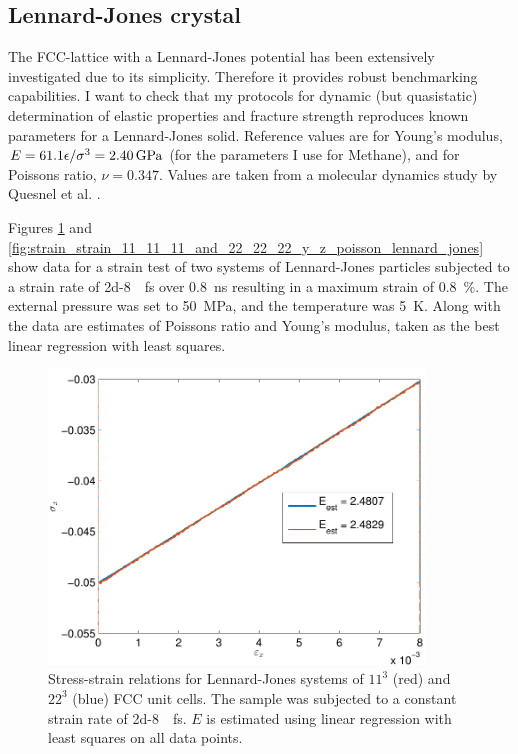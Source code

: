 \subsection{Lennard-Jones crystal}
The FCC-lattice with a Lennard-Jones potential has been extensively investigated due to its simplicity. Therefore it provides robust benchmarking capabilities. I want to check that my protocols for dynamic (but quasistatic) determination of elastic properties and fracture strength reproduces known parameters for a Lennard-Jones solid. Reference values are for Young's modulus, $E=61.1 \epsilon/\sigma^3 = \text{\SI{2.40}{\giga\pascal}}$ (for the parameters I use for Methane), and for Poissons ratio, $\nu=0.347$. Values are taken from a molecular dynamics study by Quesnel et al. \cite{Quesnel1993}.

Figures \ref{fig:stress_strain_11_11_11_and_22_22_22_y_z_poisson_lennard_jones} and \ref{fig:strain_strain_11_11_11_and_22_22_22_y_z_poisson_lennard_jones} show data for a strain test of two systems of Lennard-Jones particles subjected to a strain rate of \SI{2d-8}{\per\femto\second} over \SI{0.8}{\nano\second} resulting in a maximum strain of \SI{0.8}{\percent}. The external pressure was set to \SI{50}{\mega\pascal}, and the temperature was \SI{5}{\kelvin}. Along with the data are estimates of Poissons ratio and Young's modulus, taken as the best linear regression with least squares. 


\begin{figure}
\centering
\includegraphics[width=10cm]{../figures/thesis/stress_strain_11_11_11_and_22_22_22_y_z_poisson_lennard_jones.pdf}
\caption{Stress-strain relations for Lennard-Jones systems of $11^3$ (red) and $22^3$ (blue) FCC unit cells. The sample was subjected to a constant strain rate of \SI{2d-8}{\per\femto\second}. $E$ is estimated using linear regression with least squares on all data points.}
\label{fig:stress_strain_11_11_11_and_22_22_22_y_z_poisson_lennard_jones}
\end{figure}

